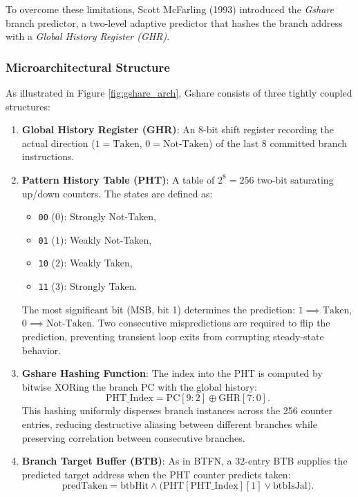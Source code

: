 To overcome these limitations, Scott McFarling (1993) introduced the \textit{Gshare} branch predictor, a two-level adaptive predictor that hashes the branch address with a \textit{Global History Register (GHR)}.

\subsubsection{Microarchitectural Structure}
As illustrated in Figure \ref{fig:gshare_arch}, Gshare consists of three tightly coupled structures:
\begin{enumerate}
    \item \textbf{Global History Register (GHR)}: An 8-bit shift register recording the actual direction ($1 = \text{Taken}$, $0 = \text{Not-Taken}$) of the last 8 committed branch instructions.
    \item \textbf{Pattern History Table (PHT)}: A table of $2^8 = 256$ two-bit saturating up/down counters. The states are defined as:
    \begin{itemize}
        \item \texttt{00} ($0$): Strongly Not-Taken,
        \item \texttt{01} ($1$): Weakly Not-Taken,
        \item \texttt{10} ($2$): Weakly Taken,
        \item \texttt{11} ($3$): Strongly Taken.
    \end{itemize}
    The most significant bit (MSB, bit 1) determines the prediction: $1 \implies \text{Taken}$, $0 \implies \text{Not-Taken}$. Two consecutive mispredictions are required to flip the prediction, preventing transient loop exits from corrupting steady-state behavior.
    \item \textbf{Gshare Hashing Function}: The index into the PHT is computed by bitwise XORing the branch PC with the global history:
    \begin{equation}
    \text{PHT\_Index} = \text{PC}[9:2] \oplus \text{GHR}[7:0].
    \end{equation}
    This hashing uniformly disperses branch instances across the 256 counter entries, reducing destructive aliasing between different branches while preserving correlation between consecutive branches.
    \item \textbf{Branch Target Buffer (BTB)}: As in BTFN, a 32-entry BTB supplies the predicted target address when the PHT counter predicts taken:
    \begin{equation}
    \text{predTaken} = \text{btbHit} \land \bigl(\text{PHT}[\text{PHT\_Index}][1] \lor \text{btbIsJal}\bigr).
    \end{equation}
\end{enumerate}


